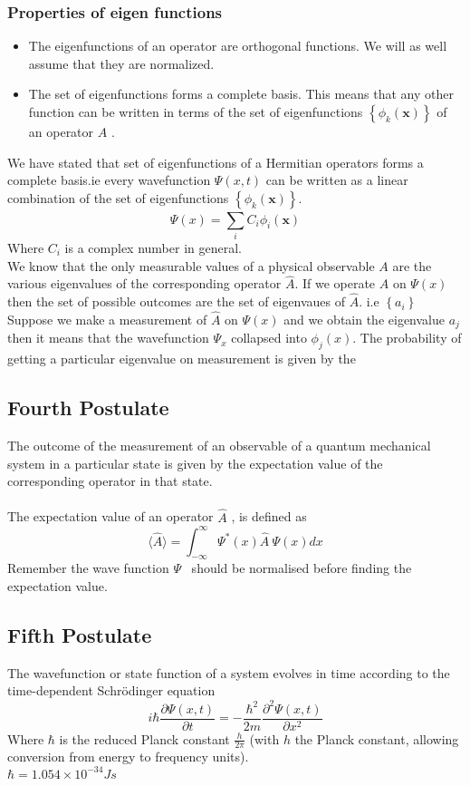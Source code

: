 \subsubsection{Properties of eigen functions}
\begin{itemize}
	\item  The eigenfunctions of an operator are orthogonal functions. We will as well assume that they are normalized. 
	\item The set of eigenfunctions forms a complete basis. This means that any other function can be written in terms of the set of eigenfunctions $\left\{\phi_{k}(\mathbf{x})\right\}$ of an operator $A$ .
\end{itemize}
We have stated that set of eigenfunctions of a Hermitian operators forms a complete basis.ie every wavefunction $\Psi(x,t)$ can be written as a linear combination of the set of eigenfunctions $\left\{\phi_{k}(\mathbf{x})\right\}$.
\begin{equation}
\Psi(x)=\sum_{i}^{}{C_{i}\phi_{i}(\mathbf{x})}
\end{equation}
Where $C_{i}$ is a complex number in general.\\
We know that the only measurable values of a physical observable ${A}$ are the various eigenvalues of the corresponding operator $\hat{{A}}$. If we operate $\hat{A}$ on $\Psi(x)$ then the set of possible outcomes are the set of eigenvaues of $\hat{{A}}$. i.e $\left\{a_{i}\right\}$
Suppose we make a measurement of $\hat{{A}}$ on $\Psi(x)$ and we obtain the eigenvalue $a_{j}$ then it means that the wavefunction $\Psi_{x}$ collapsed into $\phi_{j}(x)$. The probability of getting a particular eigenvalue on measurement is given by the 
\subsection{Fourth Postulate}
The outcome of the measurement of an observable of a quantum mechanical system in a particular state is given by the expectation value of the corresponding operator in that state.
\\\\The expectation value  of an operator $\hat{A}$ , is defined as\\
\begin{equation}
\langle \hat{A} \rangle = \int_{-\infty}^{\infty} \Psi^{*}(x) \hat{A}\  \Psi(x) dx
\end{equation}
Remember the  wave function $\Psi $ \ should be normalised before finding the expectation value.
\subsection{Fifth Postulate}
The wavefunction or state function of a system evolves in time according to the time-dependent Schrödinger equation
$$
i \hbar \frac{\partial\Psi(x,t)}{\partial t}=- \frac{\hbar^{2}}{2m} \dfrac{\partial^2 \Psi(x,t)}{\partial x^2 }
$$
Where $\hbar$ is the reduced Planck constant $\frac{h}{ 2 \pi}$ (with $h$ the Planck constant, allowing conversion from energy to frequency units).\\
$\hbar=1.054 \times 10^{-34}Js$\\\\
